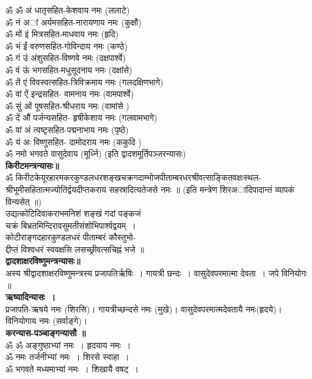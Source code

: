 \documentclass[twoside,top=1.7cm, bottom=1.7cm, outer=1cm,landscape, inner=1.5cm,a5paper,]{book}
\begin{document}
ॐ ॐ अं धातृसहित-केशवाय नमः (ललाटे)\\
ॐ नं  अां अर्यमसहित-नारायणाय नमः (कुक्षौ)\\
ॐ मों इं मित्रसहित-माधवाय नमः (हृदि)\\
ॐ भं ईं वरुणसहित-गोविन्दाय नमः (कण्ठे)\\
ॐ गं उं अंशुसहित-विष्णवे नमः (दक्षपार्श्वे)\\
ॐ वं ऊं भगसहित-मधुसूदनाय नमः (दक्षांसे)\\
ॐ तें एं विवस्वत्सहित-त्रिविक्रमाय नमः (गलदक्षिणभागे)\\
ॐ वां ऐं इन्द्रसहित- वामनाय नमः (वामपार्श्वे)\\
ॐ सुं ओं पूषसहित-श्रीधराय नमः (वामांसे )\\
ॐ दें औं पर्जन्यसहित- हृषीकेशाय नमः (गलवामभागे)\\
ॐ वां अं त्वष्टृसहित-पद्मनाभाय नमः (पृष्ठे)\\
ॐ यं अः विष्णुसहित- दामोदराय नमः (ककुदि )\\
ॐ नमो भगवते वासुदेवाय  (मूर्ध्नि) (इति द्वादशमूर्तिपञ्जरन्यासः)\\
{\bfseries किरीटमन्त्रन्यासः॥}\\
ॐ किरीटकेयूरहारमकरकुण्डलधरशङ्खचक्रगदाम्भोजपीताम्बरधरश्रीवत्साङ्कितवक्षःस्थल-\\श्रीभूमीसहितात्मज्योतिर्द्वयदीप्तकराय सहस्रादित्यतेजसे नमः ॥ (इति मन्त्रेण शिरअादिपादान्तं व्यापकं विन्यसेत् ॥)\\
उद्यत्कोटिदिवाकराभमनिशं शङ्खं गदां पङ्कजं\\
 चक्रं बिभ्रतमिन्दिरावसुमतीसंशोभिपार्श्वद्वयम्~।\\
कोटीराङ्गदहारकुण्डलधरं पीताम्बरं कौस्तुभो-\\
द्दीप्तं विश्वधरं स्ववक्षसि लसच्छ्रीवत्सचिह्नं भजे ॥\\[10pt]
{\bfseries द्वादशाक्षरविष्णुमन्त्रन्यासः॥}\\
अस्य श्रीद्वादशाक्षरविष्णुमन्त्रस्य प्रजापतिर्ऋषिः~। गायत्री छन्दः~। वासुदेवपरमात्मा देवता~। जपे विनियोगः ॥\\
{\bfseries ऋष्यादिन्यासः~।}\\
प्रजापति-ऋषये नमः (शिरसि)। गायत्रीच्छन्दसे नमः (मुखे)। वासुदेवपरमात्मदेवतायै नमः(हृदये)। विनियोगाय नमः (सर्वाङ्गे)। \\[10pt]
{\bfseries करन्यास-पञ्चाङ्गन्यासौ ॥}\\
ॐ ॐ अङ्गुष्ठाभ्यां नमः~। हृदयाय नमः~।\\
ॐ नमः	तर्जनीभ्यां नमः~। शिरसे स्वाहा~।\\
ॐ भगवते मध्यमाभ्यां नमः~। शिखायै वषट्~।\\
\end{document}
